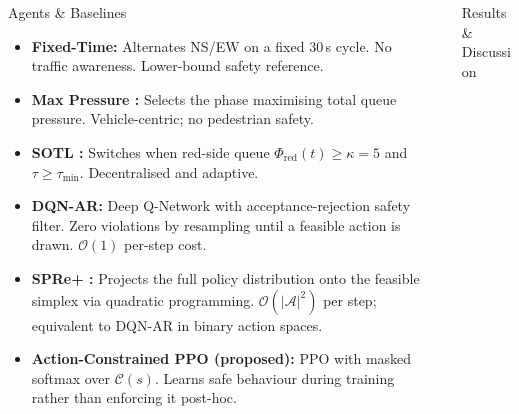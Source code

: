 \documentclass[final,20pt]{beamer}
\newlength{\sepwidth}
\newlength{\colwidth}
\newcommand{\separatorcolumn}{\begin{column}{\sepwidth}\end{column}}
\begin{document}
\begin{frame}[t]
\begin{columns}[t]
\begin{column}{\colwidth}
  \begin{block}{Agents \& Baselines}
    \begin{itemize}
      \item \textbf{Fixed-Time:} Alternates NS/EW on a fixed 30\,s cycle.
        No traffic awareness. Lower-bound safety reference.
      \item \textbf{Max Pressure \cite{varaiya2013}:} Selects the phase
        maximising total queue pressure. Vehicle-centric; no pedestrian safety.
      \item \textbf{SOTL \cite{gershenson2005}:} Switches when red-side queue
        $\Phi_\text{red}(t)\!\geq\!\kappa\!=\!5$ and $\tau\!\geq\!\tau_\text{min}$.
        Decentralised and adaptive.
      \item \textbf{DQN-AR:} Deep Q-Network with acceptance-rejection safety
        filter. Zero violations by resampling until a feasible action is drawn.
        $\mathcal{O}(1)$ per-step cost.
      \item \textbf{SPRe+ \cite{hung2025}:} Projects the full policy
        distribution onto the feasible simplex via quadratic programming.
        $\mathcal{O}(|\mathcal{A}|^2)$ per step; equivalent to DQN-AR in binary
        action spaces.
      \item \textbf{Action-Constrained PPO (proposed):} PPO with masked
        softmax over $\mathcal{C}(s)$. Learns safe behaviour during training
        rather than enforcing it post-hoc.
    \end{itemize}
  \end{block}

\end{column}

\separatorcolumn

\begin{column}{\colwidth}

  \begin{block}{Results \& Discussion}



\end{block}
\end{column}
\end{columns}
\end{frame}
\end{document}
